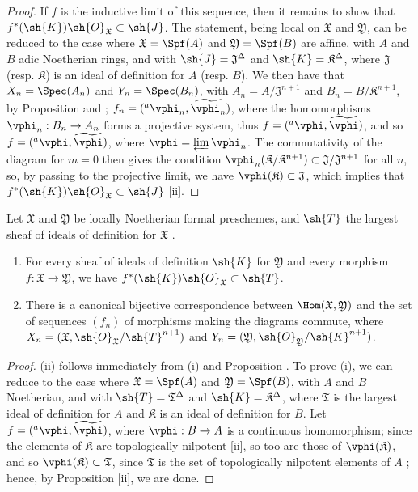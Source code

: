 \begin{proof}
If $f$ is the inductive limit of this sequence, then it remains to show that $f^*(\sh{K})\sh{O}_\mathfrak{X}\subset\sh{J}$.
The statement, being local on $\mathfrak{X}$ and $\mathfrak{Y}$, can be reduced to the case where $\mathfrak{X}=\Spf(A)$ and $\mathfrak{Y}=\Spf(B)$ are affine, with $A$ and $B$ adic Noetherian rings, and with $\sh{J}=\mathfrak{J}^\Delta$ and $\sh{K}=\mathfrak{K}^\Delta$, where $\mathfrak{J}$ (resp. $\mathfrak{K}$) is an ideal of definition for $A$ (resp. $B$).
We then have that $X_n=\Spec(A_n)$ and $Y_n=\Spec(B_n)$, with $A_n=A/\mathfrak{J}^{n+1}$ and $B_n=B/\mathfrak{K}^{n+1}$, by Proposition  and ; $f_n=({}^a\vphi_n,\widetilde{\vphi_n})$, where the homomorphisms $\vphi_n:B_n\to A_n$ forms a projective system, thus $f=({}^a\vphi,\widetilde{\vphi})$, and so $f=({}^a\vphi,\widetilde{\vphi})$, where $\vphi=\varprojlim\vphi_n$.
The commutativity of the diagram  for $m=0$ then gives the condition $\vphi_n(\mathfrak{K}/\mathfrak{K}^{n+1})\subset\mathfrak{J}/\mathfrak{J}^{n+1}$ for all $n$, so, by passing to the projective limit, we have $\vphi(\mathfrak{K})\subset\mathfrak{J}$, which implies that $f^*(\sh{K})\sh{O}_\mathfrak{X}\subset\sh{J}$ [ii].
\end{proof}

\begin{corollary}[10.6.10]
\label{I.10.6.10}
Let $\mathfrak{X}$ and $\mathfrak{Y}$ be locally Noetherian formal preschemes, and $\sh{T}$ the largest sheaf of ideals of definition for $\mathfrak{X}$ .
\begin{enumerate}
  \item[\rm{(i)}] For every sheaf of ideals of definition $\sh{K}$ for $\mathfrak{Y}$ and every morphism $f:\mathfrak{X}\to\mathfrak{Y}$, we have $f^*(\sh{K})\sh{O}_\mathfrak{X}\subset\sh{T}$.
  \item[\rm{(ii)}] There is a canonical bijective correspondence between $\Hom(\mathfrak{X},\mathfrak{Y})$ and the set of sequences $(f_n)$ of morphisms making the diagrams  commute, where $X_n=(\mathfrak{X},\sh{O}_\mathfrak{X}/\sh{T}^{n+1})$ and $Y_n=(\mathfrak{Y},\sh{O}_\mathfrak{Y}/\sh{K}^{n+1})$.
\end{enumerate}
\end{corollary}

\begin{proof}
(ii) follows immediately from (i) and Proposition .
To prove (i), we can reduce to the case where $\mathfrak{X}=\Spf(A)$ and $\mathfrak{Y}=\Spf(B)$, with $A$ and $B$ Noetherian, and with $\sh{T}=\mathfrak{T}^\Delta$ and $\sh{K}=\mathfrak{K}^\Delta$, where $\mathfrak{T}$ is the largest ideal of definition for $A$ and $\mathfrak{K}$ is an ideal of definition for $B$.
Let $f=({}^a\vphi,\widetilde{\vphi})$, where $\vphi:B\to A$ is a continuous homomorphism; since the elements of $\mathfrak{K}$ are topologically nilpotent [ii], so too are those of $\vphi(\mathfrak{K})$, and so $\vphi(\mathfrak{K})\subset\mathfrak{T}$, since $\mathfrak{T}$ is the set of topologically nilpotent elements of $A$ ; hence, by Proposition [ii], we are done.
\end{proof}

